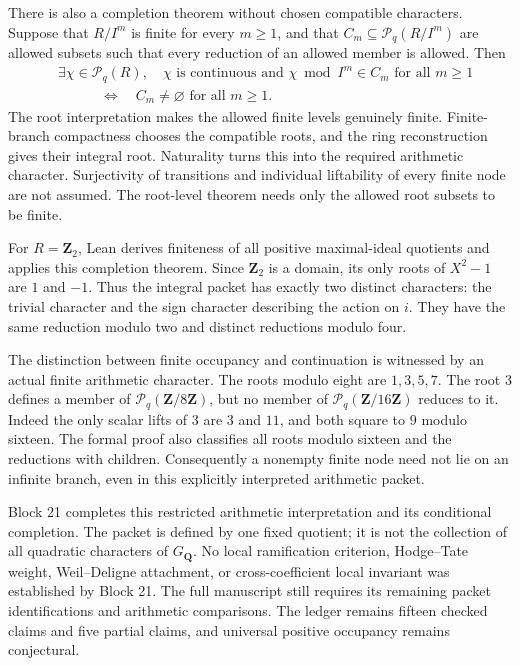 \documentclass[11pt]{article}
\theoremstyle{definition}
\theoremstyle{remark}
\newcommand{\Z}{\mathbf Z}
\newcommand{\Q}{\mathbf Q}
\begin{document}
There is also a completion theorem without chosen compatible characters.
Suppose that $R/I^m$ is finite for every $m\ge1$, and that
$C_m\subseteq\mathcal P_q(R/I^m)$ are allowed subsets such that every
reduction of an allowed member is allowed. Then
\[
\begin{split}
&\exists\chi\in\mathcal P_q(R),\quad
  \chi\text{ is continuous and }\chi\bmod I^m\in C_m
  \text{ for all }m\ge1\\
&\hspace{3em}\Longleftrightarrow\quad
  C_m\ne\varnothing\text{ for all }m\ge1.
\end{split}
\]
The root interpretation makes the allowed finite levels genuinely finite.
Finite-branch compactness chooses the compatible roots, and the ring
reconstruction gives their integral root. Naturality turns this into the
required arithmetic character. Surjectivity of transitions and individual
liftability of every finite node are not assumed. The root-level theorem
needs only the allowed root subsets to be finite.

For $R=\Z_2$, Lean derives finiteness of all positive maximal-ideal
quotients and applies this completion theorem. Since $\Z_2$ is a domain,
its only roots of $X^2-1$ are $1$ and $-1$. Thus the integral packet has
exactly two distinct characters: the trivial character and the sign
character describing the action on $i$. They have the same reduction
modulo two and distinct reductions modulo four.

The distinction between finite occupancy and continuation is witnessed
by an actual finite arithmetic character. The roots modulo eight are
$1,3,5,7$. The root $3$ defines a member of
$\mathcal P_q(\Z/8\Z)$, but no member of
$\mathcal P_q(\Z/16\Z)$ reduces to it. Indeed the only scalar lifts of
$3$ are $3$ and $11$, and both square to $9$ modulo sixteen. The formal
proof also classifies all roots modulo sixteen and the reductions with
children. Consequently a nonempty finite node need not lie on an
infinite branch, even in this explicitly interpreted arithmetic packet.

Block 21 completes this restricted arithmetic interpretation and its
conditional completion. The packet is defined by one fixed quotient; it
is not the collection of all quadratic characters of $G_{\Q}$. No local
ramification criterion, Hodge--Tate weight, Weil--Deligne attachment, or
cross-coefficient local invariant was established by Block 21. The full
manuscript still requires its remaining packet identifications and
arithmetic comparisons. The ledger remains fifteen checked claims and
five partial claims, and universal positive occupancy remains conjectural.
\end{document}
